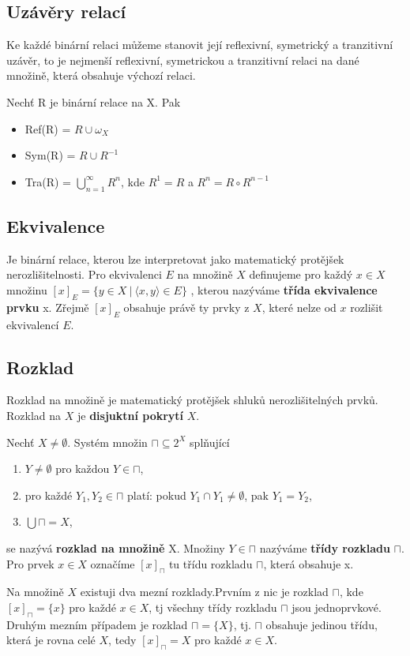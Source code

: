 \subsection{Uzávěry relací}
Ke každé binární relaci můžeme stanovit její reflexivní, symetrický a tranzitivní uzávěr, to je nejmenší reflexivní, symetrickou a tranzitivní relaci na dané množině, která obsahuje výchozí relaci.

\begin{sentence}
	Nechť R je binární relace na X. Pak
	\begin{itemize}
		\item Ref(R) = $R \cup \omega_X$
		\item Sym(R) = $R \cup R^{-1}$
		\item Tra(R) = $\bigcup^\infty_{n=1} R^n$, kde $R^1 = R$ a $R^n = R \circ R^{n-1}$
	\end{itemize}
\end{sentence}

\subsection{Ekvivalence}
Je binární relace, kterou lze interpretovat jako matematický protějšek nerozlišitelnosti. Pro ekvivalenci $E$ na množině $X$ definujeme pro každý $x \in X$ množinu $[x]_E = \{ y \in X \ | \ \langle x, y \rangle \in E\} $
, kterou nazýváme \textbf{třída ekvivalence prvku} x. Zřejmě $[x]_E$ obsahuje právě ty prvky z $X$, které nelze od $x$ rozlišit ekvivalencí $E$.

\subsection{Rozklad}
Rozklad na množině je matematický protějšek shluků nerozlišitelných prvků. Rozklad na $X$ je \textbf{disjuktní pokrytí} $X$.

\begin{definition}
	Nechť $X \not= \emptyset$. Systém množin $\sqcap \subseteq 2^X$ splňující
	\begin{enumerate}
		\item $Y \not= \emptyset$ pro každou $Y \in \sqcap$,
		\item pro každé $Y_1,Y_2 \in \sqcap$ platí: pokud $Y_1 \cap Y_1 \not= \emptyset$, pak $Y_1 = Y_2$,
		\item $\bigcup\sqcap = X$,
	\end{enumerate}
	se nazývá \textbf{rozklad na množině} X. Množiny $Y \in \sqcap$ nazýváme \textbf{třídy rozkladu} $\sqcap$. Pro prvek $x \in X$ označíme $[x]_\sqcap$ tu třídu rozkladu $\sqcap$, která obsahuje x.
\end{definition}
Na množině $X$ existuji dva mezní rozklady.Prvním z nic je rozklad $\sqcap$, kde $[x]_\sqcap = \{x\}$ pro každé $x \in X$, tj všechny třídy rozkladu $\sqcap$ jsou jednoprvkové. Druhým mezním případem je rozklad $\sqcap = \{X\}$, tj. $\sqcap$ obsahuje jedinou třídu, která je rovna celé $X$, tedy $[x]_\sqcap = X$ pro každé $x \in X$.

